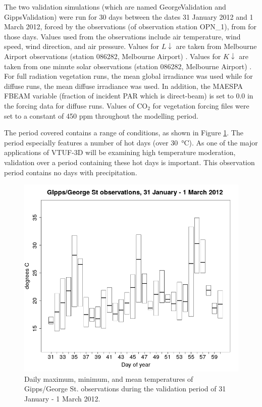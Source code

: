 \documentclass[final,3p,times,authoryear]{elsarticle}
\begin{document}
The two validation simulations (which are named GeorgeValidation and GippsValidation) were run for 30 days between the dates 31 January 2012 and 1 March 2012, forced by the observations (of observation station OPN\_1), from \cite{Coutts2015} for those days. Values used from the observations include air temperature, wind speed, wind direction, and air pressure. Values for $L\downarrow$ are taken from Melbourne Airport observations (station 086282, Melbourne Airport) \citep{BOM2016b}. Values for $K\downarrow$ are taken from one minute solar observations (station 086282, Melbourne Airport) \citep{BOM2016}.  For full radiation vegetation runs, the mean global irradiance was used while for diffuse runs, the mean diffuse irradiance was used. In addition, the MAESPA FBEAM variable (fraction of incident PAR which is direct-beam) is set to 0.0 in the forcing data for diffuse runs. Values of CO$_{2}$ for vegetation forcing files were set to a constant of 450 ppm throughout the modelling period.


The period covered contains a range of conditions, as shown in Figure \ref{fig:CoMtemp}. The period especially features a number of hot days (over 30\SI{}{\degreeCelsius}). As one of the major applications of VTUF-3D will be examining high temperature moderation, validation over a period containing these hot days is important. This observation period contains no days with precipitation.


\begin{figure}[!htbp]
\includegraphics[trim = 0mm 0mm 0mm 0mm, clip, scale=0.30]{images/CoMTempFeb2012.png}
\caption{Daily maximum, minimum, and mean temperatures of Gipps/George St. observations during the validation period of 31 January - 1 March 2012.\label{fig:CoMtemp}} 
\end{figure}
\end{document}
